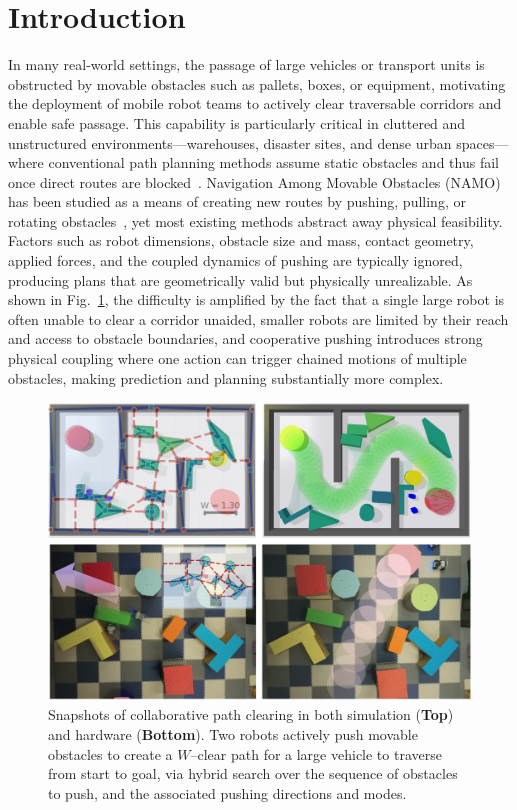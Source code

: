 \section{Introduction}\label{sec:intro}
In many real-world settings, the passage of large vehicles or transport units is
obstructed by movable obstacles such as pallets, boxes, or equipment, motivating
the deployment of mobile robot teams to actively clear traversable corridors and
enable safe passage. This capability is particularly critical in cluttered and
unstructured environments—warehouses, disaster sites, and dense urban spaces—
where conventional path planning methods assume static obstacles and thus fail
once direct routes are blocked~\cite{liu2023path}. Navigation Among Movable
Obstacles (NAMO) has been studied as a means of creating new routes by pushing,
pulling, or rotating obstacles~\cite{stilman2005navigation}, yet most existing
methods abstract away physical feasibility. Factors such as robot dimensions,
obstacle size and mass, contact geometry, applied forces, and the coupled
dynamics of pushing are typically ignored, producing plans that are geometrically
valid but physically unrealizable. As shown in Fig.~\ref{fig:snapshots},
the difficulty is amplified by the fact that
a single large robot is often unable to clear a corridor unaided, smaller robots
are limited by their reach and access to obstacle boundaries, and cooperative
pushing introduces strong physical coupling where one action can trigger chained
motions of multiple obstacles, making prediction and planning substantially more
complex.

\begin{figure}[t!]
  \centering
  \includegraphics[width=0.95\linewidth]{figures/cover.png}%
  \vspace{-0.1in}
  \caption{
    Snapshots of collaborative path clearing in both simulation (\textbf{Top})
    and hardware (\textbf{Bottom}). Two robots actively push movable
  obstacles to create a $W$--clear path for a large vehicle
  to traverse from start to goal,
  via hybrid search over the sequence of obstacles to push,
  and the associated pushing directions and modes.
  }
  \vspace{-6mm}
  \label{fig:snapshots}
\end{figure}

